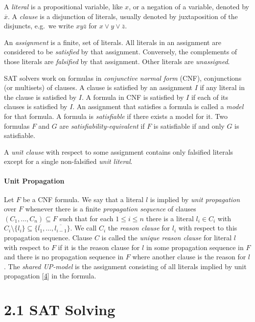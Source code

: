 \documentclass[
]{report}
\begin{document}
A \emph{literal} is a propositional variable, like \(x\), or a negation
of a variable, denoted by \(\overline{x}\). A \emph{clause} is a
disjunction of literals, usually denoted by juxtaposition of the
disjuncts, e.g.~we write \(xy\overline{z}\) for
\(x \lor y \lor \overline{z}\).

An \emph{assignment} is a finite, set of literals. All literals in an
assignment are considered to be \emph{satisfied} by that assignment.
Conversely, the complements of those literals are \emph{falsified} by
that assignment. Other literals are \emph{unassigned}.

SAT solvers work on formulas in \emph{conjunctive normal form} (CNF),
conjunctions (or multisets) of clauses. A clause is satisfied by an
assignment \(I\) if any literal in the clause is satisfied by \(I\). A
formula in CNF is satisfied by \(I\) if each of its clauses is satisfied
by \(I\). An assignment that satisfies a formula is called a
\emph{model} for that formula. A formula is \emph{satisfiable} if there
exists a model for it. Two formulas \(F\) and \(G\) are
\emph{satisfiability-equivalent} if \(F\) is satisfiable if and only
\(G\) is satisfiable.

A \emph{unit clause} with respect to some assignment contains only
falsified literals except for a single non-falsified \emph{unit
literal}.

\paragraph{Unit Propagation}

Let \(F\) be a CNF formula. We say that a literal \(l\) is implied by
\emph{unit propagation} over \(F\) whenever there is a finite
\emph{propagation sequence} of clauses \((C_1,\dots,C_n) \subseteq F\)
such that for each \(1 \leq i \leq n\) there is a literal
\(l_i \in C_i\) with
\(C_i \setminus \{l_i\} \subseteq \{\overline{l_1},\dots,\overline{l_{i-1}}\}\).
We call \(C_i\) the \emph{reason clause} for \(l_i\) with respect to
this propagation sequence. Clause \(C\) is called the \emph{unique
reason clause} for literal \(l\) with respect to \(F\) if it is the
reason clause for \(l\) in some propagation sequence in \(F\) and there
is no propagation sequence in \(F\) where another clause is the reason
for \(l\). The \emph{shared UP-model} is the assignment consisting of
all literals implied by unit propagation
{[}\protect\hyperlink{ref-rebola2018two}{4}{]} in the formula.

\hypertarget{sat-solving}{%
\section{2.1 SAT Solving}\label{sat-solving}}
\end{document}
